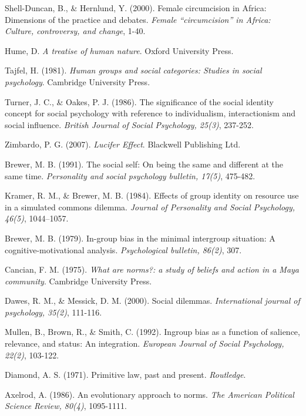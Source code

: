 \documentclass[rutwik_proposal.tex]{subfiles}
\begin{document}
\begin{thebibliography}{100}
Shell-Duncan, B., \& Hernlund, Y. 
(2000). 
Female circumcision in Africa: Dimensions of the practice and debates. 
\emph{Female “circumcision” in Africa: Culture, controversy, and change}, 
1-40.

Hume, D.
\emph{A treatise of human nature}.
Oxford University Press.

Tajfel, H. 
(1981). 
\emph{Human groups and social categories: Studies in social psychology}. 
Cambridge University Press.

Turner, J. C., \& Oakes, P. J. 
(1986). 
The significance of the social identity concept for social psychology with reference to individualism, interactionism and social influence. 
\emph{British Journal of Social Psychology, 25(3)}, 
237-252.

Zimbardo, P. G. 
(2007). 
\emph{Lucifer Effect}. 
Blackwell Publishing Ltd.

Brewer, M. B. 
(1991). 
The social self: On being the same and different at the same time. 
\emph{Personality and social psychology bulletin, 17(5)}, 
475-482.

Kramer, R. M., \& Brewer, M. B. 
(1984). 
Effects of group identity on resource use in a simulated commons dilemma. 
\emph{Journal of Personality and Social Psychology, 46(5)}, 
1044–1057.

Brewer, M. B. 
(1979). 
In-group bias in the minimal intergroup situation: A cognitive-motivational analysis. 
\emph{Psychological bulletin, 86(2)}, 
307.

Cancian, F. M. 
(1975). 
\emph{What are norms?: a study of beliefs and action in a Maya community}. 
Cambridge University Press.

Dawes, R. M., \& Messick, D. M. 
(2000). 
Social dilemmas. 
\emph{International journal of psychology, 35(2)}, 
111-116.

Mullen, B., Brown, R., \& Smith, C. 
(1992). 
Ingroup bias as a function of salience, relevance, and status: An integration. 
\emph{European Journal of Social Psychology, 22(2)}, 
103-122.

Diamond, A. S. 
(1971). 
Primitive law, past and present. 
\emph{Routledge}.

Axelrod, A.
(1986).
An evolutionary approach to norms.
\emph{The American Political Science Review, 80(4)},
1095-1111.


\end{thebibliography}
\end{document}
